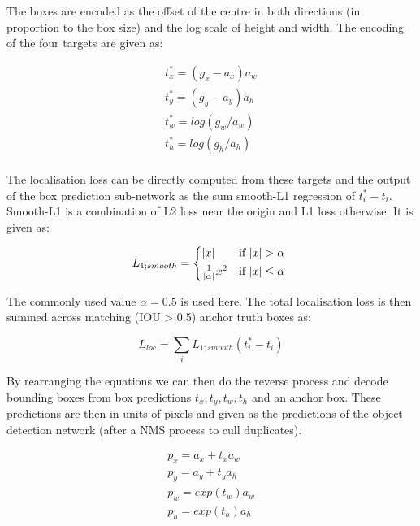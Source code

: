 The boxes are encoded as the offset of the centre in both directions (in proportion to the box size) and the log scale of height and width. The encoding of the four targets are given as:

\begin{equation}
\begin{split}
t^*_x = (g_x - a_x) a_w\\
t^*_y = (g_y - a_y) a_h\\
t^*_w = log(g_w / a_w)\\
t^*_h = log(g_h / a_h)\\
\end{split}
\label{eq:encoding_rcnn}
\end{equation}

The localisation loss can be directly computed from these targets and the output of the box prediction sub-network as the sum smooth-L1 regression of $t_i^* - t_i$. Smooth-L1 is a combination of L2 loss near the origin and L1 loss otherwise. It is given as:

\begin{equation}
L_{1;smooth} = 
\begin{cases*}
|x| & if $|x|>\alpha $ \\
\frac{1}{|\alpha|}x^2 & if $|x| \leq \alpha$
\end{cases*}
\label{eq:smooth_l1}
\end{equation}

The commonly used value $\alpha = 0.5$ is used here. The total localisation loss is then summed across matching (\gls{IOU} > 0.5) anchor truth boxes as:

\begin{equation}
L_{loc} = \sum_i{L_{1;smooth}(t_i^* - t_i)}
\label{eq:loss_loc}
\end{equation}

By rearranging the equations we can then do the reverse process and decode bounding boxes from box predictions $t_x, t_y, t_w, t_h$  and an anchor box. These predictions are then in units of pixels and given as the predictions of the object detection network (after a \gls{NMS} process to cull duplicates).

\begin{equation}
\begin{split}
p_x = a_x + t_x  a_w\\
p_y = a_y + t_y  a_h\\
p_w = exp(t_w) a_w \\
p_h = exp(t_h) a_h\\
\end{split}
\label{eq:decoding_rcnn}
\end{equation}

